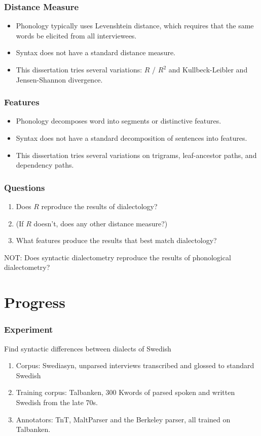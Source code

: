 \documentclass{beamer}
\begin{document}
\begin{frame}
  \frametitle{Distance Measure}
  \begin{itemize}
  \item Phonology typically uses Levenshtein distance, which requires
    that the same words be elicited from all interviewees.
  \item Syntax does not have a standard distance measure.
  \item This dissertation tries several variations: $R$ / $R^2$ and
   Kullbeck-Leibler and Jensen-Shannon divergence.
  \end{itemize}
\end{frame}

\begin{frame}
  \frametitle{Features}
  \begin{itemize}
  \item Phonology decomposes word into segments or distinctive features.
  \item Syntax does not have a standard decomposition of sentences into features.
  \item This dissertation tries several variations on trigrams,
    leaf-ancestor paths, and dependency paths.
  \end{itemize}
\end{frame}

\begin{frame}
  \frametitle{Questions}
  \begin{enumerate}
  \item Does $R$ reproduce the results of dialectology?
  \item (If $R$ doesn't, does any other distance measure?)
  \item What features produce the results that best match
    dialectology?
 \end{enumerate}
 NOT: Does syntactic dialectometry reproduce the results of
 phonological dialectometry?
\end{frame}

\section{Progress}

\begin{frame}
  \frametitle{Experiment}
  Find syntactic differences between dialects of Swedish
  \begin{enumerate}
  \item Corpus: Swediasyn, unparsed interviews transcribed and glossed
    to standard Swedish
  \item Training corpus: Talbanken, 300 Kwords of parsed spoken and
    written Swedish from the late 70s.
  \item Annotators: TnT, MaltParser and the Berkeley parser, all
    trained on Talbanken.
  \end{enumerate}
\end{frame}
\end{document}
